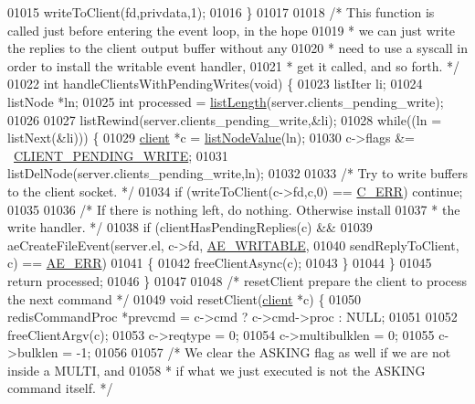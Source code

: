 \begin{DoxyCode}
{{{{{{{{{{{01015     writeToClient(fd,privdata,1);
01016 \}
01017 
01018 \textcolor{comment}{/* This function is called just before entering the event loop, in the hope}
01019 \textcolor{comment}{ * we can just write the replies to the client output buffer without any}
01020 \textcolor{comment}{ * need to use a syscall in order to install the writable event handler,}
01021 \textcolor{comment}{ * get it called, and so forth. */}
01022 \textcolor{keywordtype}{int} handleClientsWithPendingWrites(\textcolor{keywordtype}{void}) \{
01023     listIter li;
01024     listNode *ln;
01025     \textcolor{keywordtype}{int} processed = \hyperlink{adlist_8h_afde0ab079f934670e82119b43120e94b}{listLength}(server.clients\_pending\_write);
01026 
01027     listRewind(server.clients\_pending\_write,&li);
01028     \textcolor{keywordflow}{while}((ln = listNext(&li))) \{
01029         \hyperlink{structclient}{client} *c = \hyperlink{adlist_8h_af84cae230e7180ebcda1e2736fce9f65}{listNodeValue}(ln);
01030         c->flags &= ~\hyperlink{server_8h_addd2e991874faef411339e9ae9619023}{CLIENT\_PENDING\_WRITE};
01031         listDelNode(server.clients\_pending\_write,ln);
01032 
01033         \textcolor{comment}{/* Try to write buffers to the client socket. */}
01034         \textcolor{keywordflow}{if} (writeToClient(c->fd,c,0) == \hyperlink{server_8h_af98ac28d5f4d23d7ed5985188e6fb7d1}{C\_ERR}) \textcolor{keywordflow}{continue};
01035 
01036         \textcolor{comment}{/* If there is nothing left, do nothing. Otherwise install}
01037 \textcolor{comment}{         * the write handler. */}
01038         \textcolor{keywordflow}{if} (clientHasPendingReplies(c) &&
01039             aeCreateFileEvent(server.el, c->fd, \hyperlink{ae_8h_ab6bfb0366ccb6277112d132c2a2bf500}{AE\_WRITABLE},
01040                 sendReplyToClient, c) == \hyperlink{ae_8h_aa16dcf7effdf8f8df97f51b1cb51a9df}{AE\_ERR})
01041         \{
01042             freeClientAsync(c);
01043         \}
01044     \}
01045     \textcolor{keywordflow}{return} processed;
01046 \}
01047 
01048 \textcolor{comment}{/* resetClient prepare the client to process the next command */}
01049 \textcolor{keywordtype}{void} resetClient(\hyperlink{structclient}{client} *c) \{
01050     redisCommandProc *prevcmd = c->cmd ? c->cmd->proc : NULL;
01051 
01052     freeClientArgv(c);
01053     c->reqtype = 0;
01054     c->multibulklen = 0;
01055     c->bulklen = -1;
01056 
01057     \textcolor{comment}{/* We clear the ASKING flag as well if we are not inside a MULTI, and}
01058 \textcolor{comment}{     * if what we just executed is not the ASKING command itself. */}
}}}}}}}}}}}
\end{DoxyCode}
